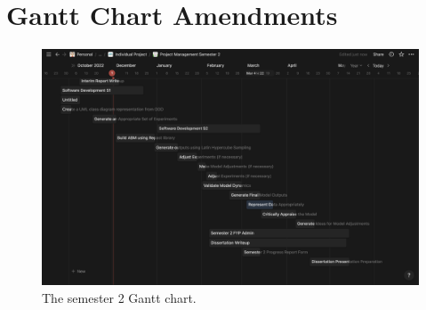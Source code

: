 \chapter{Gantt Chart Amendments}

\begin{figure}[h]
\centering
\includegraphics[width=\linewidth]{figures/S2Gantt.png}
\caption{The semester 2 Gantt chart.}
\label{fig:S2Gantt}
\end{figure}
